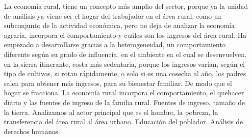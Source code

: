 \documentclass[
  a4paper,
]{article}
\begin{document}
La economía rural, tiene un concepto más amplio del sector, porque ya la
unidad de análisis ya viene ser el hogar del trabajador en el área
rural, como un subconjunto de la actividad económica, pero no deja de
analizar la economía agraria, incorpora el comportamiento y cuáles son
los ingresos del área rural. Ha empezado a desarrollarse gracias a la
heterogeneidad, un comportamiento diferente según su grado de
influencia, en el ambiente en el cual se desenvuelven, en la sierra
itinerante, costa más sedentaria, porque los ingresos varían, según el
tipo de cultivos, si rotan rápidamente, o solo si es una cosecha al año,
los padres salen para obtener más ingresos, para su bienestar familiar.
De modo que el hogar se fracciona. La economía rural incorpora el
comportamiento, el quehacer diario y las fuentes de ingreso de la
familia rural. Fuentes de ingreso, tamaño de la tierra. Analizamos al
actor principal que es el hombre, la pobreza, la transferencia del área
rural al área urbano. Educación del poblador. Análisis de derechos
humanos.
\end{document}
